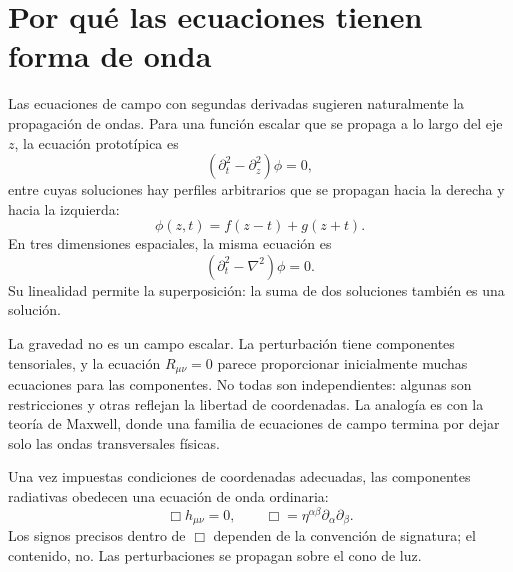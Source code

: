 \begin{classroomqa}
\end{classroomqa}

\section{Por qué las ecuaciones tienen forma de onda}

Las ecuaciones de campo con segundas derivadas sugieren naturalmente la propagación de ondas. Para una función escalar que se propaga a lo largo del eje \(z\), la ecuación prototípica es
\begin{equation}
 \left(\partial_t^2-\partial_z^2\right)\phi=0,
\end{equation}
entre cuyas soluciones hay perfiles arbitrarios que se propagan hacia la derecha y hacia la izquierda:
\begin{equation}
 \phi(z,t)=f(z-t)+g(z+t).
\end{equation}
En tres dimensiones espaciales, la misma ecuación es
\begin{equation}
 \left(\partial_t^2-\nabla^2\right)\phi=0.
\end{equation}
Su linealidad permite la superposición: la suma de dos soluciones también es una solución.

La gravedad no es un campo escalar. La perturbación tiene componentes tensoriales, y la ecuación \(R_{\mu\nu}=0\) parece proporcionar inicialmente muchas ecuaciones para las componentes. No todas son independientes: algunas son restricciones y otras reflejan la libertad de coordenadas. La analogía es con la teoría de Maxwell, donde una familia de ecuaciones de campo termina por dejar solo las ondas transversales físicas.

Una vez impuestas condiciones de coordenadas adecuadas, las componentes radiativas obedecen una ecuación de onda ordinaria:
\begin{equation}
 \Box h_{\mu\nu}=0,
 \qquad
 \Box=\eta^{\alpha\beta}\partial_\alpha\partial_\beta.
 \label{eq:linear-wave}
\end{equation}
Los signos precisos dentro de \(\Box\) dependen de la convención de signatura; el contenido, no. Las perturbaciones se propagan sobre el cono de luz.

